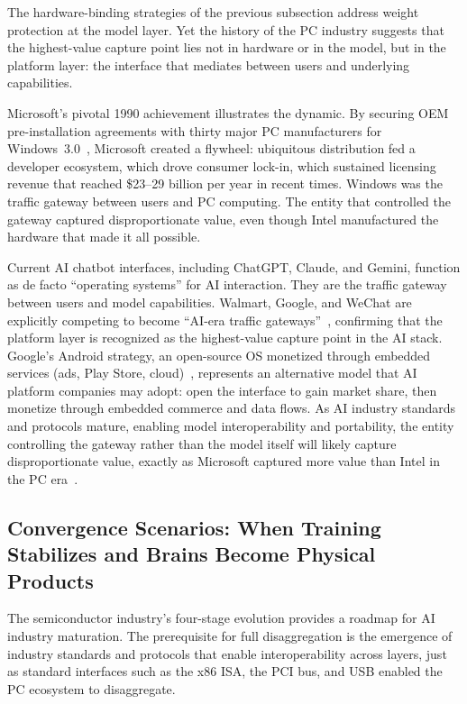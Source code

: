 The hardware-binding strategies of the previous subsection address weight protection at the model layer. Yet the history of the PC industry suggests that the highest-value capture point lies not in hardware or in the model, but in the platform layer: the interface that mediates between users and underlying capabilities.

Microsoft's pivotal 1990 achievement illustrates the dynamic. By securing OEM pre-installation agreements with thirty major PC manufacturers for Windows~3.0~\cite{licendi2024mslicensing}, Microsoft created a flywheel: ubiquitous distribution fed a developer ecosystem, which drove consumer lock-in, which sustained licensing revenue that reached \$23--29 billion per year in recent times. Windows was the traffic gateway between users and PC computing. The entity that controlled the gateway captured disproportionate value, even though Intel manufactured the hardware that made it all possible.

Current AI chatbot interfaces, including ChatGPT, Claude, and Gemini, function as de facto ``operating systems'' for AI interaction. They are the traffic gateway between users and model capabilities. Walmart, Google, and WeChat are explicitly competing to become ``AI-era traffic gateways''~\cite{ceibs2025aiagents}, confirming that the platform layer is recognized as the highest-value capture point in the AI stack. Google's Android strategy, an open-source OS monetized through embedded services (ads, Play Store, cloud)~\cite{wikipedia2024msopensource}, represents an alternative model that AI platform companies may adopt: open the interface to gain market share, then monetize through embedded commerce and data flows. As AI industry standards and protocols mature, enabling model interoperability and portability, the entity controlling the gateway rather than the model itself will likely capture disproportionate value, exactly as Microsoft captured more value than Intel in the PC era~\cite{ccia2025competition}.

\subsection{Convergence Scenarios: When Training Stabilizes and Brains Become Physical Products}
\label{sec:convergence}

The semiconductor industry's four-stage evolution provides a roadmap for AI industry maturation. The prerequisite for full disaggregation is the emergence of industry standards and protocols that enable interoperability across layers, just as standard interfaces such as the x86 ISA, the PCI bus, and USB enabled the PC ecosystem to disaggregate.

